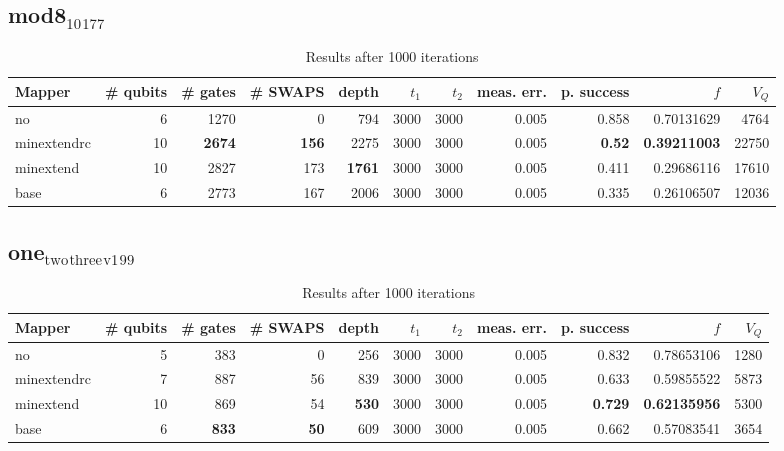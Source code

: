 \documentclass[11pt]{article}
\begin{document}
\subsection{mod8\(_{\text{10}}\)\(_{\text{177}}\)}
\label{sec:org9fffaa7}
\begin{table}[H]
\caption{\label{tab:org151b6e0}
Results after 1000 iterations}
\centering
\small
\begin{tabular}{lrrrrrrrrrr}
\hline
Mapper & \# qubits & \# gates & \# SWAPS & depth & \(t_1\) & \(t_2\) & meas. err. & p. success & \(f\) & \(V_Q\)\\
\hline
no & 6 & 1270 & 0 & 794 & 3000 & 3000 & 0.005 & 0.858 & 0.70131629 & 4764\\
\hline
minextendrc & 10 & \textbf{2674} & \textbf{156} & 2275 & 3000 & 3000 & 0.005 & \textbf{0.52} & \textbf{0.39211003} & 22750\\
minextend & 10 & 2827 & 173 & \textbf{1761} & 3000 & 3000 & 0.005 & 0.411 & 0.29686116 & 17610\\
base & 6 & 2773 & 167 & 2006 & 3000 & 3000 & 0.005 & 0.335 & 0.26106507 & 12036\\
\hline
\end{tabular}
\end{table}
\subsection{one\(_{\text{two}}\)\(_{\text{three}}\)\(_{\text{v1}}\)\(_{\text{99}}\)}
\label{sec:org7af35ed}
\begin{table}[H]
\caption{\label{tab:org173cb42}
Results after 1000 iterations}
\centering
\small
\begin{tabular}{lrrrrrrrrrr}
\hline
Mapper & \# qubits & \# gates & \# SWAPS & depth & \(t_1\) & \(t_2\) & meas. err. & p. success & \(f\) & \(V_Q\)\\
\hline
no & 5 & 383 & 0 & 256 & 3000 & 3000 & 0.005 & 0.832 & 0.78653106 & 1280\\
\hline
minextendrc & 7 & 887 & 56 & 839 & 3000 & 3000 & 0.005 & 0.633 & 0.59855522 & 5873\\
minextend & 10 & 869 & 54 & \textbf{530} & 3000 & 3000 & 0.005 & \textbf{0.729} & \textbf{0.62135956} & 5300\\
base & 6 & \textbf{833} & \textbf{50} & 609 & 3000 & 3000 & 0.005 & 0.662 & 0.57083541 & 3654\\
\hline
\end{tabular}
\end{table}
\end{document}
